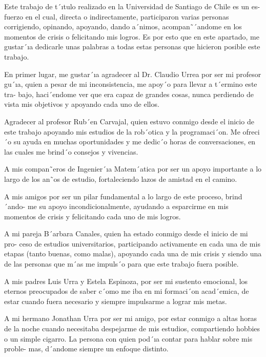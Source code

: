 \thispagestyle{fancy}
\vspace{5mm}
Este trabajo de t´ıtulo realizado en la Universidad de Santiago de Chile es un es- fuerzo en el cual, directa o indirectamente, participaron varias personas corrigiendo, opinando,  apoyando,  dando  a´nimos,  acompan˜´andome  en  los  momentos  de  crisis  o felicitando mis logros. Es por esto que en este apartado, me gustar´ıa dedicarle unas palabras a todas estas personas que hicieron posible este trabajo.

En primer lugar, me gustar´ıa agradecer al Dr. Claudio Urrea por ser mi profesor gu´ıa,  quien  a  pesar  de  mi  inconsistencia,  me  apoy´o  para  llevar  a  t´ermino  este  tra- bajo, haci´endome ver que era capaz de grandes cosas, nunca perdiendo de vista mis objetivos y apoyando cada uno de ellos.

Agradecer  al  profesor  Rub´en  Carvajal,  quien  estuvo  conmigo  desde  el  inicio  de este trabajo apoyando mis estudios de la rob´otica y la programaci´on. Me ofreci´o su ayuda en muchas oportunidades y me dedic´o horas de conversaciones, en las cuales me brind´o consejos y vivencias.

A  mis  compan˜eros  de  Ingenier´ıa  Matem´atica  por  ser  un  apoyo  importante  a  lo largo de los an˜os de estudio, fortaleciendo lazos de amistad en el camino.

A mis amigos por ser un pilar fundamental a lo largo de este proceso, brind´ando- me su apoyo incondicionalmente, ayudando a esparcirme en mis momentos de crisis y felicitando cada uno de mis logros.

A mi pareja B´arbara Canales, quien ha estado conmigo desde el inicio de mi pro- ceso de estudios universitarios, participando activamente en cada una de mis etapas (tanto buenas, como malas), apoyando cada una de mis crisis y siendo una de las personas que m´as me impuls´o para que este trabajo fuera posible.

A mis padres Luis Urra y Estela Espinoza, por ser mi sustento emocional, los eternos  preocupados  de  saber  c´omo  me  iba  en  mi  formaci´on  acad´emica,  de  estar cuando fuera necesario y siempre impulsarme a lograr mis metas.
 

A mi hermano Jonathan Urra por ser mi amigo, por estar conmigo a altas horas de la noche cuando necesitaba despejarme de mis estudios, compartiendo hobbies o un simple cigarro. La persona con quien pod´ıa contar para hablar sobre mis proble- mas, d´andome siempre un enfoque distinto.

